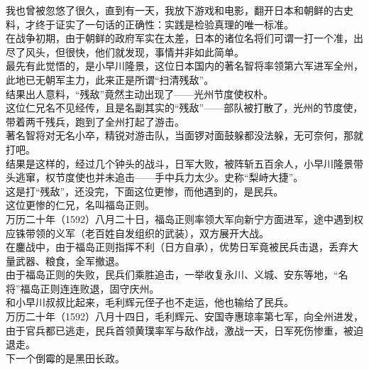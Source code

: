\begin{multicols}{\theparacolNo}
我也曾被忽悠了很久，直到有一天，我放下游戏和电影，翻开日本和朝鲜的古史料，才终于证实了一句话的正确性：实践是检验真理的唯一标准。\\

在战争初期，由于朝鲜的政府军实在太差，日本的诸位名将们可谓一打一个准，出尽了风头，但很快，他们就发现，事情并非如此简单。\\

最先有此觉悟的，是小早川隆景，这位日本国内的著名智将率领第六军进军全州，此地已无朝军主力，此来正是所谓“扫清残敌”。\\

结果出人意料，“残敌”竟然主动出现了——光州节度使权朴。\\

这位仁兄名不见经传，且是名副其实的“残敌”——部队被打散了，光州的节度使，带着两千残兵，跑到了全州打起了游击。\\

著名智将对无名小卒，精锐对游击队，当面锣对面鼓躲都没法躲，无可奈何，那就打吧。\\

结果是这样的，经过几个钟头的战斗，日军大败，被阵斩五百余人，小早川隆景带头逃窜，权节度使也并未追击——手中兵力太少。史称“梨峙大捷”。\\

这是打“残敌”，还没完，下面这位更惨，而他遇到的，是民兵。\\

这位更惨的仁兄，名叫福岛正则。\\

万历二十年（1592）八月二十日，福岛正则率领大军向新宁方面进军，途中遇到权应铢带领的义军（老百姓自发组织的武装），双方展开大战。\\

在鏖战中，由于福岛正则指挥不利（日方自承），优势日军竟被民兵击退，丢弃大量武器、粮食，全军撤退。\\

由于福岛正则的失败，民兵们乘胜追击，一举收复永川、义城、安东等地，“名将”福岛正则连连败退，固守庆州。\\

和小早川叔叔比起来，毛利辉元侄子也不走运，他也输给了民兵。\\

万历二十年（1592）八月十四日，毛利辉元、安国寺惠琼率第七军，向全州进发，由于官兵都已逃走，民兵首领黄璞率军与敌作战，激战一天，日军死伤惨重，被迫退走。\\

下一个倒霉的是黑田长政。\\


\end{multicols}
